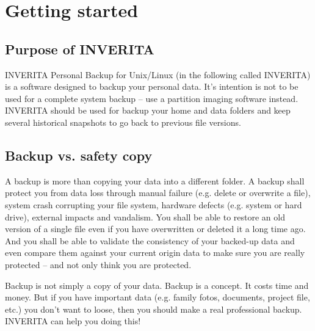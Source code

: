 %
%
%
%


\chapter{Getting started}

\section{Purpose of INVERITA}
INVERITA Personal Backup for Unix/Linux (in the following called INVERITA)
is a software designed to backup your personal data. It's intention is not to be
used for a complete system backup -- use a partition imaging software instead.
INVERITA should be used for backup your home and data folders and keep several
historical snapshots to go back to previous file versions.

\section{Backup vs. safety copy}
A backup is more than copying your data into a different folder. A backup shall
protect you from data loss through manual failure (e.g. delete or overwrite a file),
system crash corrupting your file system, hardware defects (e.g. system or
hard drive), external impacts and vandalism. You shall be able to restore an old
version of a single file even if you have overwritten or deleted it a long time ago.
And you shall be able to validate the consistency of your backed-up data and even
compare them against your current origin data to make sure you are really
protected -- and not only think you are protected.

Backup is not simply a copy of your data. Backup is a concept. It costs time
and money. But if you have important data (e.g. family fotos, documents, project file, etc.)
you don't want to loose, then you should make a real professional backup.
INVERITA can help you doing this!

